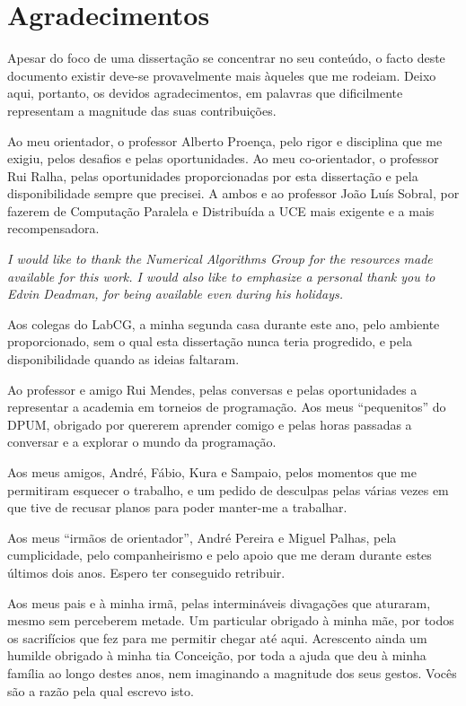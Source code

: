 \documentclass[../extabst]{subfiles}
\begin{document}
	\chapter*{Agradecimentos}
	Apesar do foco de uma dissertação se concentrar no seu conteúdo, o facto deste documento existir deve-se provavelmente mais àqueles que me rodeiam. Deixo aqui, portanto, os devidos agradecimentos, em palavras que dificilmente representam a magnitude das suas contribuições.

	Ao meu orientador, o professor Alberto Proença, pelo rigor e disciplina que me exigiu, pelos desafios e pelas oportunidades. Ao meu co-orientador, o professor Rui Ralha, pelas oportunidades proporcionadas por esta dissertação e pela disponibilidade sempre que precisei. A ambos e ao professor João Luís Sobral, por fazerem de Computação Paralela e Distribuída a UCE mais exigente e a mais recompensadora.

	{\itshape
	I would like to thank the Numerical Algorithms Group for the resources made available for this work. I would also like to emphasize a personal thank you to Edvin Deadman, for being available even during his holidays.
	}

	Aos colegas do LabCG, a minha segunda casa durante este ano, pelo ambiente proporcionado, sem o qual esta dissertação nunca teria progredido, e pela disponibilidade quando as ideias faltaram.

	Ao professor e amigo Rui Mendes, pelas conversas e pelas oportunidades a representar a academia em torneios de programação. Aos meus ``pequenitos'' do DPUM, obrigado por quererem aprender comigo e pelas horas passadas a conversar e a explorar o mundo da programação.

	Aos meus amigos, André, Fábio, Kura e Sampaio, pelos momentos que me permitiram esquecer o trabalho, e um pedido de desculpas pelas várias vezes em que tive de recusar planos para poder manter-me a trabalhar.

	Aos meus ``irmãos de orientador'', André Pereira e Miguel Palhas, pela cumplicidade, pelo companheirismo e pelo apoio que me deram durante estes últimos dois anos. Espero ter conseguido retribuir.

	Aos meus pais e à minha irmã, pelas intermináveis divagações que aturaram, mesmo sem perceberem metade. Um particular obrigado à minha mãe, por todos os sacrifícios que fez para me permitir chegar até aqui. Acrescento ainda um humilde obrigado à minha tia Conceição, por toda a ajuda que deu à minha família ao longo destes anos, nem imaginando a magnitude dos seus gestos. Vocês são a razão pela qual escrevo isto.
\end{document}
